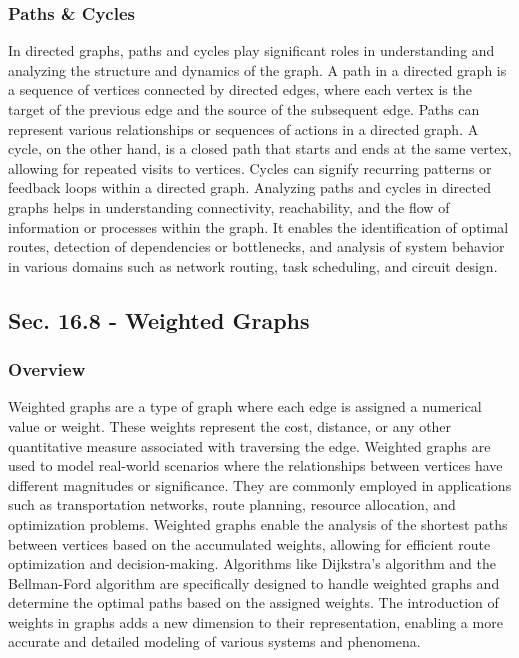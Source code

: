 \subsubsection{Paths \& Cycles}

In directed graphs, paths and cycles play significant roles in understanding and analyzing the structure and dynamics of the graph. A path in a directed graph is a sequence of vertices connected by directed 
edges, where each vertex is the target of the previous edge and the source of the subsequent edge. Paths can represent various relationships or sequences of actions in a directed graph. A cycle, on the other 
hand, is a closed path that starts and ends at the same vertex, allowing for repeated visits to vertices. Cycles can signify recurring patterns or feedback loops within a directed graph. Analyzing paths and 
cycles in directed graphs helps in understanding connectivity, reachability, and the flow of information or processes within the graph. It enables the identification of optimal routes, detection of dependencies 
or bottlenecks, and analysis of system behavior in various domains such as network routing, task scheduling, and circuit design.

\subsection*{Sec. 16.8 - Weighted Graphs}

\subsubsection{Overview}

Weighted graphs are a type of graph where each edge is assigned a numerical value or weight. These weights represent the cost, distance, or any other quantitative measure associated with traversing the edge. 
Weighted graphs are used to model real-world scenarios where the relationships between vertices have different magnitudes or significance. They are commonly employed in applications such as transportation networks, 
route planning, resource allocation, and optimization problems. Weighted graphs enable the analysis of the shortest paths between vertices based on the accumulated weights, allowing for efficient route optimization 
and decision-making. Algorithms like Dijkstra's algorithm and the Bellman-Ford algorithm are specifically designed to handle weighted graphs and determine the optimal paths based on the assigned weights. The 
introduction of weights in graphs adds a new dimension to their representation, enabling a more accurate and detailed modeling of various systems and phenomena.

